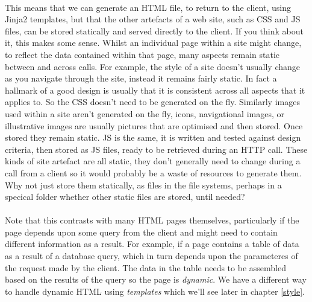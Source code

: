 \documentclass[12pt, a4paper, oneside]{book}
\begin{document}
\paragraph{} This means that we can generate an HTML file, to return to the client, using Jinja2 templates, but that the other artefacts of a web site, such as CSS and JS files, can be stored statically and served directly to the client. If you think about it, this makes some sense. Whilst an individual page within a site might change, to reflect the data contained within that page, many aspects remain static between and across calls. For example, the style of a site doesn't usually change as you navigate through the site, instead it remains fairly static. In fact a hallmark of a good design is usually that it is consistent across all aspects that it applies to. So the CSS doesn't need to be generated on the fly. Similarly images used within a site aren't generated on the fly, icons, navigational images, or illustrative images are usually pictures that are optimised and then stored. Once stored they remain static. JS is the same, it is written and tested against design criteria, then stored as JS files, ready to be retrieved during an HTTP call. These kinds of site artefact are all static, they don't generally need to change during a call from a client so it would probably be a waste of resources to generate them. Why not just store them statically, as files in the file systems, perhaps in a specical folder whether other static files are stored, until needed?

\paragraph{} Note that this contrasts with many HTML pages themselves, particularly if the page depends upon some query from the client and might need to contain different information as a result. For example, if a page contains a table of data as a result of a database query, which in turn depends upon the parameteres of the request made by the client. The data in the table needs to be assembled based on the results of the query so the page is \emph{dynamic}. We have a different way to handle dynamic HTML using \emph{templates} which we'll see later in chapter \ref{style}.
\end{document}
